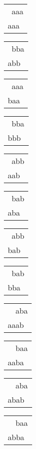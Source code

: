 \begin{tabular}{|l|} \hline
\ aaa \\
aaa\  \\
\hline
\end{tabular} 
\begin{tabular}{|l|} \hline
\ bba \\
abb\  \\
\hline
\end{tabular} 
\begin{tabular}{|l|} \hline
\ aaa \\
baa\  \\
\hline
\end{tabular} 
\begin{tabular}{|l|} \hline
\ bba \\
bbb\  \\
\hline
\end{tabular} 
\begin{tabular}{|l|} \hline
\ abb \\
aab\  \\
\hline
\end{tabular} 
\begin{tabular}{|l|} \hline
\ bab \\
aba\  \\
\hline
\end{tabular} 
\begin{tabular}{|l|} \hline
\ abb \\
bab\  \\
\hline
\end{tabular} 
\begin{tabular}{|l|} \hline
\ bab \\
bba\  \\
\hline
\end{tabular} 
\begin{tabular}{|l|} \hline
\ \ aba \\
aaab\  \\
\hline
\end{tabular} 
\begin{tabular}{|l|} \hline
\ \ baa \\
aaba\  \\
\hline
\end{tabular} 
\begin{tabular}{|l|} \hline
\ \ aba \\
abab\  \\
\hline
\end{tabular} 
\begin{tabular}{|l|} \hline
\ \ baa \\
abba\  \\
\hline
\end{tabular} 
